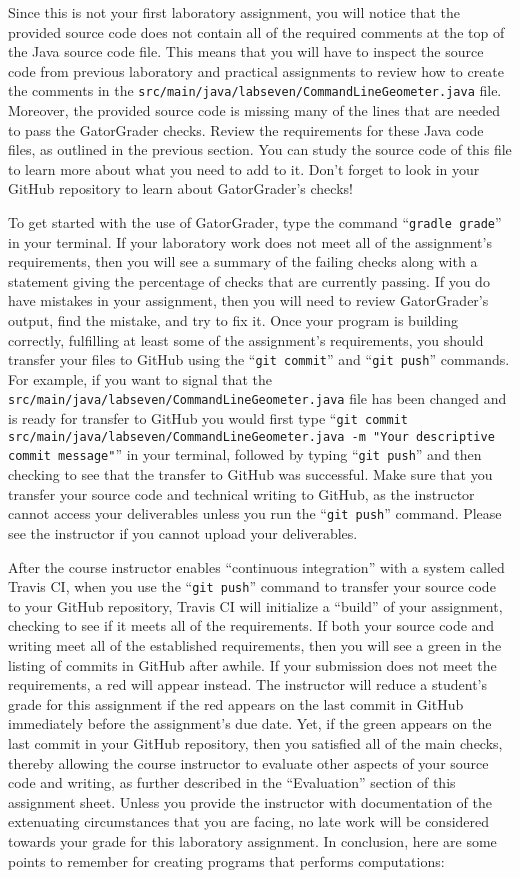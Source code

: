 \documentclass[11pt]{article}
\newcommand{\mainprogramsource}{\lstinline{src/main/java/labseven/CommandLineGeometer.java}}
\newcommand{\gatorgraderstart}{\command{gradle grade}}
\newcommand{\gitcommit}{\command{git commit}}
\newcommand{\gitpush}{\command{git push}}
\newcommand{\gitcommitmainprogram}{\command{git commit src/main/java/labseven/CommandLineGeometer.java -m "Your
descriptive commit message"}}
\newcommand{\command}[1]{``\lstinline{#1}''}
\newcommand{\step}[1]{``{#1}''}
\newcommand{\checkmark}{\ding{51}}
\newcommand{\naughtmark}{\ding{55}}
\begin{document}
Since this is not your first laboratory assignment, you will notice that the
provided source code does not contain all of the required comments at the top of
the Java source code file. This means that you will have to inspect the source
code from previous laboratory and practical assignments to review how to create
the comments in the \mainprogramsource{} file. Moreover, the provided source
code is missing many of the lines that are needed to pass the GatorGrader
checks. Review the requirements for these Java code files, as outlined in the
previous section. You can study the source code of this file to learn more about
what you need to add to it. Don't forget to look in your GitHub repository to
learn about GatorGrader's checks!

To get started with the use of GatorGrader, type the command \gatorgraderstart{}
in your terminal. If your laboratory work does not meet all of the assignment's
requirements, then you will see a summary of the failing checks along with a
statement giving the percentage of checks that are currently passing. If you do
have mistakes in your assignment, then you will need to review GatorGrader's
output, find the mistake, and try to fix it. Once your program is building
correctly, fulfilling at least some of the assignment's requirements, you should
transfer your files to GitHub using the \gitcommit{} and \gitpush{} commands.
For example, if you want to signal that the \mainprogramsource{} file has been
changed and is ready for transfer to GitHub you would first type
\gitcommitmainprogram{} in your terminal, followed by typing \gitpush{} and then
checking to see that the transfer to GitHub was successful. Make sure that you
transfer your source code and technical writing to GitHub, as the instructor
cannot access your deliverables unless you run the \gitpush{} command. Please
see the instructor if you cannot upload your deliverables.

After the course instructor enables \step{continuous integration} with a system
called Travis CI, when you use the \gitpush{} command to transfer your source
code to your GitHub repository, Travis CI will initialize a \step{build} of your
assignment, checking to see if it meets all of the requirements. If both your
source code and writing meet all of the established requirements, then you will
see a green \checkmark{} in the listing of commits in GitHub after awhile. If
your submission does not meet the requirements, a red \naughtmark{} will appear
instead. The instructor will reduce a student's grade for this assignment if the
red \naughtmark{} appears on the last commit in GitHub immediately before the
assignment's due date. Yet, if the green \checkmark{} appears on the last commit
in your GitHub repository, then you satisfied all of the main checks, thereby
allowing the course instructor to evaluate other aspects of your source code and
writing, as further described in the \step{Evaluation} section of this
assignment sheet. Unless you provide the instructor with documentation of the
extenuating circumstances that you are facing, no late work will be considered
towards your grade for this laboratory assignment. In conclusion, here are some
points to remember for creating programs that performs computations:
\end{document}
